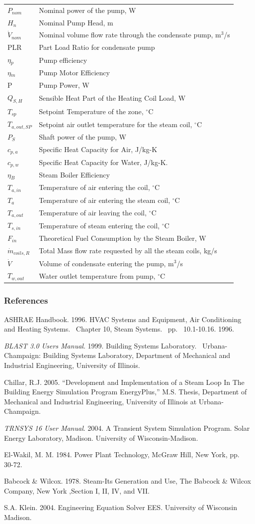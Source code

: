 \begin{longtable}[c]{p{1.0in}p{4.0in}}
\(P_{nom}\) & Nominal power of the pump, W \tabularnewline
\(H_{n}\) & Nominal Pump Head, m \tabularnewline
\(\dot V_{nom}\) & Nominal volume flow rate through the condensate pump, m\(^3\)/s \tabularnewline
PLR & Part Load Ratio for condensate pump \tabularnewline
\(\eta\)\(_{p}\) & Pump efficiency \tabularnewline
\(\eta\)\(_{m}\) & Pump Motor Efficiency \tabularnewline
P & Pump Power, W \tabularnewline
\(Q_{S,H}\) & Sensible Heat Part of the Heating Coil Load, W \tabularnewline
\(T_{sp}\) & Setpoint Temperature of the zone, \(^{\circ}\)C \tabularnewline
\(T_{a,out,SP}\) & Setpoint air outlet temperature for the steam coil, \(^{\circ}\)C \tabularnewline
\(P_{S}\) & Shaft power of the pump, W \tabularnewline
\(c_{p,a}\) & Specific Heat Capacity for Air, J/kg-K \tabularnewline
\(c_{p,w}\) & Specific Heat Capacity for Water, J/kg-K. \tabularnewline
\(\eta\)\(_{B}\) & Steam Boiler Efficiency \tabularnewline
\(T_{a,in}\) & Temperature of air entering the coil, \(^{\circ}\)C \tabularnewline
\(T_{a}\) & Temperature of air entering the steam coil, \(^{\circ}\)C \tabularnewline
\(T_{a,out}\) & Temperature of air leaving the coil, \(^{\circ}\)C \tabularnewline
\(T_{s,in}\) & Temperature of steam entering the coil, \(^{\circ}\)C \tabularnewline
\(F_{in}\) & Theoretical Fuel Consumption by the Steam Boiler, W \tabularnewline
\(\dot m_{coils,R}\) & Total Mass flow rate requested by all the steam coils, kg/s \tabularnewline
\(\dot V\) & Volume of condensate entering the pump, m\(^3\)/s \tabularnewline
\(T_{w,out}\) & Water outlet temperature from pump, \(^{\circ}\)C \tabularnewline
\bottomrule
\end{longtable}

\subsubsection{References}\label{references-007}

ASHRAE Handbook. 1996. HVAC Systems and Equipment, Air Conditioning and Heating Systems.~ Chapter 10, Steam Systems.~ pp.\emph{~} 10.1-10.16. 1996.

\emph{BLAST 3.0 Users Manual}. 1999. Building Systems Laboratory.~ Urbana-Champaign: Building Systems Laboratory, Department of Mechanical and Industrial Engineering, University of Illinois.

Chillar, R.J. 2005. ``Development and Implementation of a Steam Loop In The Building Energy Simulation Program EnergyPlus,'' M.S. Thesis, Department of Mechanical and Industrial Engineering, University of Illinois at Urbana-Champaign.

\emph{TRNSYS 16 User Manual}. 2004. A Transient System Simulation Program. Solar Energy Laboratory, Madison. University of Wisconsin-Madison.

El-Wakil, M. M. 1984. Power Plant Technology, McGraw Hill, New York, pp.~~ 30-72.

Babcock \& Wilcox. 1978. Steam-Its Generation and Use, The Babcock \& Wilcox Company, New York ,Section I, II, IV, and VII.

S.A. Klein. 2004. Engineering Equation Solver EES. University of Wisconsin Madison.
